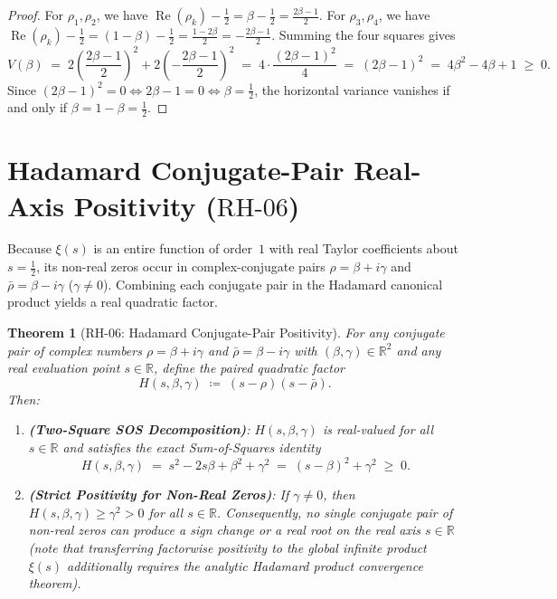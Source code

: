 \documentclass[11pt,a4paper]{article}
\theoremstyle{plain}
\newtheorem{theorem}{Theorem}[section]
\theoremstyle{definition}
\theoremstyle{remark}
\newcommand{\R}{\mathbb{R}}
\DeclareMathOperator{\RePart}{Re}
\begin{document}
\begin{proof}
For $\rho_1, \rho_2$, we have $\RePart(\rho_k) - \frac{1}{2} = \beta - \frac{1}{2} = \frac{2\beta - 1}{2}$. For $\rho_3, \rho_4$, we have $\RePart(\rho_k) - \frac{1}{2} = (1 - \beta) - \frac{1}{2} = \frac{1 - 2\beta}{2} = -\frac{2\beta - 1}{2}$. Summing the four squares gives
\[
  V(\beta) \;=\; 2\left(\frac{2\beta - 1}{2}\right)^2 + 2\left(-\frac{2\beta - 1}{2}\right)^2 \;=\; 4 \cdot \frac{(2\beta - 1)^2}{4} \;=\; (2\beta - 1)^2 \;=\; 4\beta^2 - 4\beta + 1 \;\ge\; 0.
\]
Since $(2\beta - 1)^2 = 0 \iff 2\beta - 1 = 0 \iff \beta = \frac{1}{2}$, the horizontal variance vanishes if and only if $\beta = 1 - \beta = \frac{1}{2}$.
\end{proof}

\section{Hadamard Conjugate-Pair Real-Axis Positivity (\texorpdfstring{$\mathrm{RH\text{-}06}$}{RH-06})}

Because $\xi(s)$ is an entire function of order~$1$ with real Taylor coefficients about $s = \frac{1}{2}$, its non-real zeros occur in complex-conjugate pairs $\rho = \beta + i\gamma$ and $\bar{\rho} = \beta - i\gamma$ ($\gamma \ne 0$). Combining each conjugate pair in the Hadamard canonical product yields a real quadratic factor.

\begin{theorem}[$\mathrm{RH\text{-}06}$: Hadamard Conjugate-Pair Positivity]\label{thm:rh06}
For any conjugate pair of complex numbers $\rho = \beta + i\gamma$ and $\bar{\rho} = \beta - i\gamma$ with $(\beta, \gamma) \in \R^2$ and any real evaluation point $s \in \R$, define the paired quadratic factor
\begin{equation}
  H(s, \beta, \gamma) \;\coloneqq\; (s - \rho)(s - \bar{\rho}).
\end{equation}
Then:
\begin{enumerate}
  \item \textbf{(Two-Square SOS Decomposition)}: $H(s, \beta, \gamma)$ is real-valued for all $s \in \R$ and satisfies the exact Sum-of-Squares identity
  \begin{equation}\label{eq:rh06-sos}
    H(s, \beta, \gamma) \;=\; s^2 - 2s\beta + \beta^2 + \gamma^2 \;=\; (s - \beta)^2 + \gamma^2 \;\ge\; 0.
  \end{equation}
  \item \textbf{(Strict Positivity for Non-Real Zeros)}: If $\gamma \ne 0$, then $H(s, \beta, \gamma) \ge \gamma^2 > 0$ for all $s \in \R$. Consequently, no single conjugate pair of non-real zeros can produce a sign change or a real root on the real axis $s \in \R$ (note that transferring factorwise positivity to the global infinite product $\xi(s)$ additionally requires the analytic Hadamard product convergence theorem).
\end{enumerate}
\end{theorem}
\end{document}
